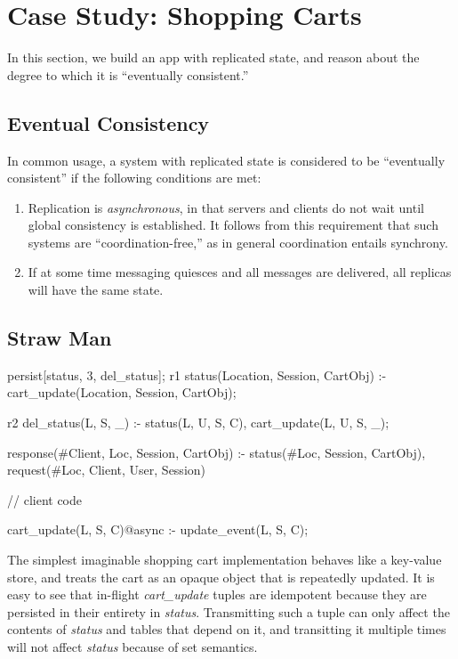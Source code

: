\section{Case Study: Shopping Carts}

In this section, we build an app with replicated state, and reason about the degree to which
it is ``eventually consistent.''

\subsection{Eventual Consistency}

In common usage, a system with replicated state is considered to be ``eventually consistent'' 
if the following conditions are met:

\begin{enumerate}
\item Replication is \emph{asynchronous}, in that servers and clients do not wait until global consistency is established.  It follows from this requirement that such systems are ``coordination-free,'' as in general coordination entails synchrony. 
\item If at some time messaging quiesces and all messages are delivered, all replicas will have the same state.
\end{enumerate}

\subsection{Straw Man}

\begin{Dedalus}
persist[status, 3, del_status];
r1
status(Location, Session, CartObj) :-
    cart_update(Location,  Session, CartObj);
    
r2
del_status(L, S, _) :-
    status(L, U, S, C),
    cart_update(L, U, S, _);

response(#Client, Loc, Session, CartObj) :-
    status(#Loc, Session, CartObj),
    request(#Loc, Client, User, Session)

// client code

cart_update(L, S, C)@async :- 
    update_event(L, S, C);

\end{Dedalus}

The simplest imaginable shopping cart implementation behaves like a key-value store,
and treats the cart as an opaque object that is repeatedly updated.  It is easy to see that
in-flight {\em cart\_update} tuples are idempotent 
because they are persisted in their entirety
in {\em status}.  Transmitting such a tuple can only affect the contents of {\em status} and tables that depend on it, and transitting it multiple times will not affect {\em status} because of set
semantics.

